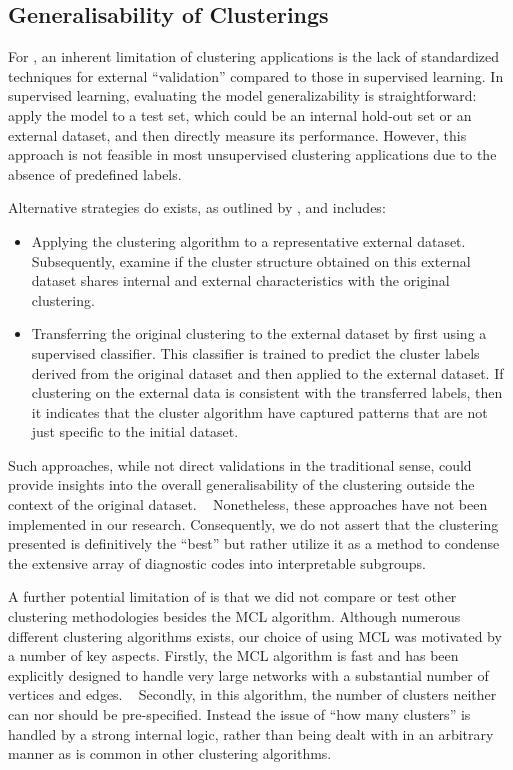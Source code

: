 \subsection{Generalisability of Clusterings}

For \studyi{},
an inherent limitation of clustering applications is 
the lack of standardized techniques for external \enquote{validation}
compared to those in supervised learning.
In supervised learning, 
evaluating the model generalizability is straightforward:
apply the model to a test set, 
which could be an internal hold-out set or an external dataset,
and then directly measure its performance.
However, this approach is not feasible in most unsupervised clustering
applications due to the absence of predefined labels.

Alternative strategies do exists,
as outlined by \textcite{ullmannValidation2022},
and includes:
\begin{itemize}
    \item Applying the clustering algorithm to a representative external
        dataset. Subsequently, examine if the cluster structure obtained on
        this external dataset shares internal and external characteristics with
        the original clustering. 
    \item Transferring the original clustering to the external dataset by first
        using a supervised classifier. This classifier is trained to predict
        the cluster labels derived from the original dataset and then applied
        to the external dataset. 
        If clustering on the external data is consistent with the transferred
        labels, then it indicates that the cluster algorithm have 
        captured  patterns that are not just specific to the initial
        dataset.
\end{itemize}
Such approaches, while not direct validations in the traditional sense, 
could provide insights into the overall generalisability of the clustering 
outside the context of the original dataset.
~\autocite{ullmannValidation2022}
Nonetheless, these approaches have not been implemented in our research.
Consequently, we do not assert that the clustering presented is definitively
the \enquote{best} but rather utilize it as a method to condense the extensive
array of diagnostic codes into interpretable subgroups.

A further potential limitation of \studyi{} 
is that we did not compare or test other 
clustering methodologies besides the \ac{MCL} algorithm.
Although numerous different clustering algorithms exists,
our choice of using \ac{MCL} was motivated by a number of key aspects.
Firstly, the \ac{MCL} algorithm is fast and has been explicitly designed 
to handle very large networks with a substantial number of vertices
and edges.
~\autocite{vandongenGraph2008}
Secondly, in this algorithm,
the number of clusters neither can nor should be pre-specified.
Instead the issue of \enquote{how many clusters} is handled
by a strong internal logic, rather than being dealt with in an
arbitrary manner as is common in other clustering algorithms.
~\autocite{vandongenGraph2008}


